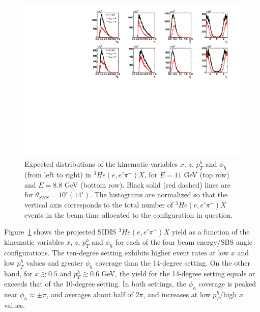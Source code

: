 \paragraph{}
\begin{figure}[h]
  \begin{center}
    \includegraphics[width=.98\textwidth]{figures/kine14deg10deg_comparison.pdf}
  \end{center}
  \caption{\label{kine14_10_1D} Expected distributions of the kinematic variables $x$, $z$, $p_T^h$ and $\phi_h$ (from left to right) in $^3He(e,e'\pi^+)X$, for $E = 11$ GeV (top row) and $E = 8.8$ GeV (bottom row). Black solid (red dashed) lines are for $\theta_{SBS} = 10^\circ (14^\circ)$. The histograms are normalized so that the vertical axis corresponds to the total number of $^3He(e,e'\pi^+)X$ events in the beam time allocated to the configuration in question.}
\end{figure}
Figure~\ref{kine14_10_1D} shows the projected SIDIS $^3He(e,e'\pi^+)X$ yield as a function of the kinematic variables $x$, $z$, $p_T^h$ and $\phi_h$ for each of the four beam energy/SBS angle configurations. The ten-degree setting exhibits higher event rates at low $x$ and low $p_T^h$ values and greater $\phi_h$ coverage than the 14-degree setting. On the other hand, for $x \gtrsim 0.5$ and $p_T^h \gtrsim 0.6$ GeV, the yield for the 14-degree setting equals or exceeds that of the 10-degree setting. In both settings, the $\phi_h$ coverage is peaked near $\phi_h \approx \pm \pi$, and averages about half of 2$\pi$, and increases at low $p_T^h$/high $x$ values. 

